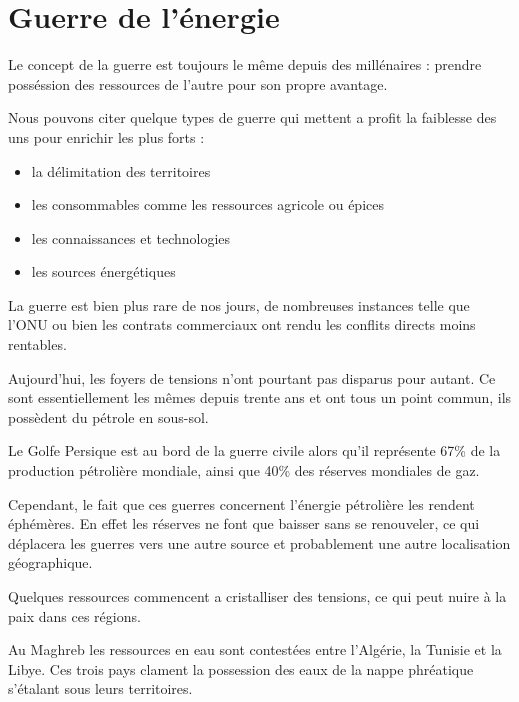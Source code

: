 \section{Guerre de l'énergie}

Le concept de la guerre est toujours le même depuis des millénaires : prendre posséssion des
ressources de l'autre pour son propre avantage.

Nous pouvons citer quelque types de guerre qui mettent a profit la faiblesse des uns
pour enrichir les plus forts :

\begin{itemize}
  \item la délimitation des territoires %
  \item les consommables comme les ressources agricole ou épices
  \item les connaissances et technologies
  \item les sources énergétiques
\end{itemize}

La guerre est bien plus rare de nos jours, de nombreuses instances telle que l'ONU ou bien les
contrats commerciaux ont rendu les conflits directs moins rentables.

Aujourd'hui, les foyers de tensions n’ont pourtant pas disparus pour autant.
Ce sont essentiellement les mêmes depuis trente ans et ont tous un point commun,
ils possèdent du pétrole en sous-sol.

Le Golfe Persique est au bord de la guerre civile alors qu'il représente 67\%
de la production pétrolière mondiale, ainsi que 40\% des réserves mondiales de gaz.

Cependant, le fait que ces guerres concernent l'énergie pétrolière les rendent éphémères.
En effet les réserves ne font que baisser sans se renouveler, ce qui déplacera les
guerres vers une autre source et probablement une autre localisation géographique.

Quelques ressources commencent a cristalliser des tensions, ce qui peut nuire à la paix
dans ces régions.

Au Maghreb les ressources en eau sont contestées entre l'Algérie, la Tunisie et la Libye. Ces
trois pays clament la possession des eaux de la nappe phréatique s'étalant sous leurs
territoires.

